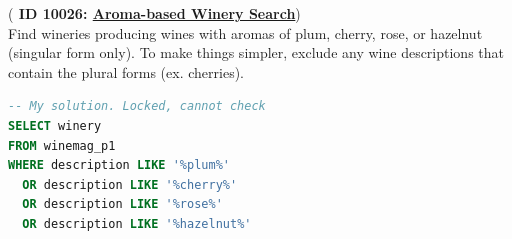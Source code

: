 \begin{exm} ({\bf {\color{orange} ID 10026: }\href{https://platform.stratascratch.com/coding/10026-find-all-wineries-which-produce-wines-by-possessing-aromas-of-plum-cherry-rose-or-hazelnut?code_type=3}{Aroma-based Winery Search}})\\
Find wineries producing wines with aromas of plum, cherry, rose, or 
hazelnut (singular form only). To make things simpler, exclude any wine 
descriptions that contain the plural forms (ex. cherries).
\begin{lstlisting}[language=SQL, linewidth=1.1\textwidth]
-- My solution. Locked, cannot check
SELECT winery
FROM winemag_p1
WHERE description LIKE '%plum%'
  OR description LIKE '%cherry%'
  OR description LIKE '%rose%'
  OR description LIKE '%hazelnut%'
\end{lstlisting}
\end{exm}

